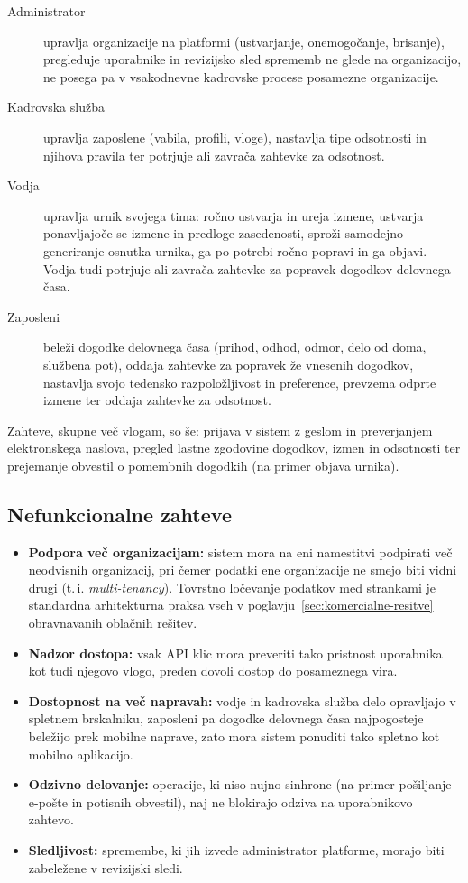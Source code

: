 \begin{description}
    \item[Administrator] upravlja organizacije na platformi (ustvarjanje, onemogočanje, brisanje), pregleduje uporabnike in revizijsko sled sprememb ne glede na organizacijo, ne posega pa v vsakodnevne kadrovske procese posamezne organizacije.
    \item[Kadrovska služba] upravlja zaposlene (vabila, profili, vloge), nastavlja tipe odsotnosti in njihova pravila ter potrjuje ali zavrača zahtevke za odsotnost.
    \item[Vodja] upravlja urnik svojega tima: ročno ustvarja in ureja izmene, ustvarja ponavljajoče se izmene in predloge zasedenosti, sproži samodejno generiranje osnutka urnika, ga po potrebi ročno popravi in ga objavi. Vodja tudi potrjuje ali zavrača zahtevke za popravek dogodkov delovnega časa.
    \item[Zaposleni] beleži dogodke delovnega časa (prihod, odhod, odmor, delo od doma, službena pot), oddaja zahtevke za popravek že vnesenih dogodkov, nastavlja svojo tedensko razpoložljivost in preference, prevzema odprte izmene ter oddaja zahtevke za odsotnost.
\end{description}

Zahteve, skupne več vlogam, so še: prijava v sistem z geslom in preverjanjem elektronskega naslova, pregled lastne zgodovine dogodkov, izmen in odsotnosti ter prejemanje obvestil o pomembnih dogodkih (na primer objava urnika).

\subsection{Nefunkcionalne zahteve}

\begin{itemize}
    \item \textbf{Podpora več organizacijam:} sistem mora na eni namestitvi podpirati več neodvisnih organizacij, pri čemer podatki ene organizacije ne smejo biti vidni drugi (t.\,i. \textit{multi-tenancy}). Tovrstno ločevanje podatkov med strankami je standardna arhitekturna praksa vseh v poglavju~\ref{sec:komercialne-resitve} obravnavanih oblačnih rešitev.
    \item \textbf{Nadzor dostopa:} vsak API klic mora preveriti tako pristnost uporabnika kot tudi njegovo vlogo, preden dovoli dostop do posameznega vira.
    \item \textbf{Dostopnost na več napravah:} vodje in kadrovska služba delo opravljajo v spletnem brskalniku, zaposleni pa dogodke delovnega časa najpogosteje beležijo prek mobilne naprave, zato mora sistem ponuditi tako spletno kot mobilno aplikacijo.
    \item \textbf{Odzivno delovanje:} operacije, ki niso nujno sinhrone (na primer pošiljanje e-pošte in potisnih obvestil), naj ne blokirajo odziva na uporabnikovo zahtevo.
    \item \textbf{Sledljivost:} spremembe, ki jih izvede administrator platforme, morajo biti zabeležene v revizijski sledi.
\end{itemize}

